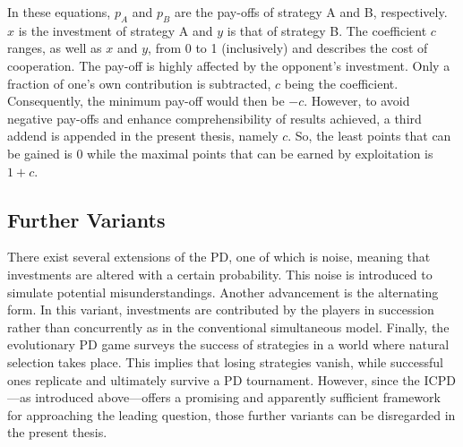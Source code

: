 \documentclass[11pt]{article}
\begin{document}
\noindent
In these equations, $p_A$ and $p_B$ are the pay-offs of strategy A and B, respectively.
$x$ is the investment of strategy A and $y$ is that of strategy B.
The coefficient $c$ ranges, as well as $x$ and $y$, from 0 to 1 (inclusively) and describes the cost of cooperation.
The pay-off is highly affected by the opponent's investment.
Only a fraction of one's own contribution is subtracted, $c$ being the coefficient.
Consequently, the minimum pay-off would then be $-c$.
However, to avoid negative pay-offs and enhance comprehensibility of results achieved, a third addend is appended in the present thesis, namely $c$.
So, the least points that can be gained is 0 while the maximal points that can be earned by exploitation is $1 + c$.



\subsection{Further Variants}

There exist several extensions of the PD, one of which is noise, meaning that investments are altered with a certain probability.
This noise is introduced to simulate potential misunderstandings.
Another advancement is the alternating form.
In this variant, investments are contributed by the players in succession rather than concurrently as in the conventional simultaneous model.
Finally, the evolutionary PD game surveys the success of strategies in a world where natural selection takes place.
This implies that losing strategies vanish, while successful ones replicate and ultimately survive a PD tournament.
However, since the ICPD---as introduced above---offers a promising and apparently sufficient framework for approaching the leading question, those further variants can be disregarded in the present thesis.
\end{document}
